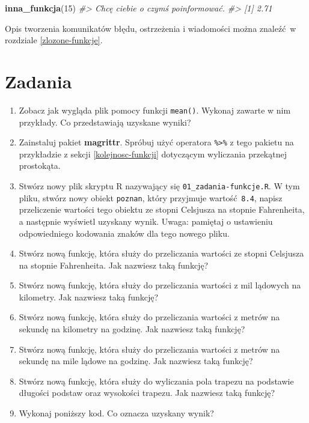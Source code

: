 \documentclass[paper=6in:9in,pagesize=pdftex,headinclude=on,footinclude=on,10pt]{scrbook}
\newenvironment{Shaded}{\begin{snugshade}}{\end{snugshade}}
\newcommand{\CommentTok}[1]{\textcolor[rgb]{0.56,0.35,0.01}{\textit{#1}}}
\newcommand{\DecValTok}[1]{\textcolor[rgb]{0.00,0.00,0.81}{#1}}
\newcommand{\KeywordTok}[1]{\textcolor[rgb]{0.13,0.29,0.53}{\textbf{#1}}}
\newcommand{\NormalTok}[1]{#1}
\providecommand{\tightlist}{%
  \setlength{\itemsep}{0pt}\setlength{\parskip}{0pt}}
\begin{document}
\begin{Shaded}
\begin{Highlighting}[]
\KeywordTok{inna_funkcja}\NormalTok{(}\DecValTok{15}\NormalTok{)}
\CommentTok{#> Chcę ciebie o czymś poinformować.}
\CommentTok{#> [1] 2.71}
\end{Highlighting}
\end{Shaded}

Opis tworzenia komunikatów błędu, ostrzeżenia i wiadomości można znaleźć~w rozdziale \ref{zlozone-funkcje}.

\hypertarget{zadania-2}{%
\section{Zadania}\label{zadania-2}}

\begin{enumerate}
\def\labelenumi{\arabic{enumi})}
\tightlist
\item
  Zobacz jak wygląda plik pomocy funkcji \texttt{mean()}.
  Wykonaj zawarte w nim przykłady.
  Co przedstawiają uzyskane wyniki?
\item
  Zainstaluj pakiet \textbf{magrittr}.
  Spróbuj użyć operatora \texttt{\%\textgreater{}\%} z tego pakietu na przykładzie z sekcji \ref{kolejnosc-funkcji} dotyczącym wyliczania przekątnej prostokąta.
\item
  Stwórz nowy plik skryptu R nazywający się \texttt{01\_zadania-funkcje.R}.
  W tym pliku, stwórz nowy obiekt \texttt{poznan}, który przyjmuje wartość~\texttt{8.4}, napisz przeliczenie wartości tego obiektu ze stopni Celsjusza na stopnie Fahrenheita, a następnie wyświetl uzyskany wynik.
  Uwaga: pamiętaj o ustawieniu odpowiedniego kodowania znaków dla tego nowego pliku.
\item
  Stwórz nową funkcję, która służy do przeliczania wartości ze stopni Celsjusza na stopnie Fahrenheita.
  Jak nazwiesz taką funkcję?
\item
  Stwórz nową funkcję, która służy do przeliczania wartości z mil lądowych na kilometry.
  Jak nazwiesz taką funkcję?
\item
  Stwórz nową funkcję, która służy do przeliczania wartości z metrów na sekundę na kilometry na godzinę.
  Jak nazwiesz taką funkcję?
\item
  Stwórz nową funkcję, która służy do przeliczania wartości z metrów na sekundę na mile lądowe na godzinę.
  Jak nazwiesz taką funkcję?
\item
  Stwórz nową funkcję, która służy do wyliczania pola trapezu na podstawie długości podstaw oraz wysokości trapezu.
  Jak nazwiesz taką funkcję?
\item
  Wykonaj poniższy kod.
  Co oznacza uzyskany wynik?
\end{enumerate}
\end{document}
